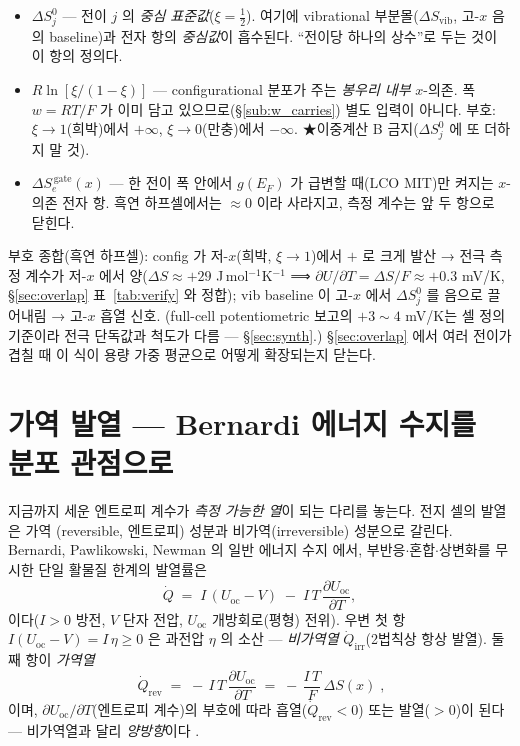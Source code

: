 \documentclass[11pt,a4paper]{article}
\newcommand{\rev}{\mathrm{rev}}
\newcommand{\irr}{\mathrm{irr}}
\newcommand{\oc}{\mathrm{oc}}
\newcommand{\vibr}{\mathrm{vib}}
\begin{document}
\begin{itemize}[leftmargin=1.4em,itemsep=3pt]
\item $\Delta S^0_j$ — 전이 $j$ 의 \emph{중심 표준값}($\xi=\tfrac12$). 여기에 vibrational
부분몰($\Delta S_\vibr$, 고-$x$ 음의 baseline)과 전자 항의 \emph{중심값}이 흡수된다. ``전이당 하나의
상수''로 두는 것이 이 항의 정의다.
\item $R\ln[\xi/(1-\xi)]$ — configurational 분포가 주는 \emph{봉우리 내부} $x$-의존. 폭 $w=RT/F$ 가
이미 담고 있으므로(\S\ref{sub:w_carries}) 별도 입력이 아니다. 부호: $\xi\to1$(희박)에서 $+\infty$,
$\xi\to0$(만충)에서 $-\infty$. ★이중계산 B 금지($\Delta S^0_j$ 에 또 더하지 말 것).
\item $\Delta S_e^{\,\mathrm{gate}}(x)$ — 한 전이 폭 안에서 $g(E_F)$ 가 급변할 때(LCO MIT)만 켜지는
$x$-의존 전자 항. 흑연 하프셀에서는 $\approx0$ 이라 사라지고, 측정 계수는 앞 두 항으로 닫힌다.
\end{itemize}

부호 종합(흑연 하프셀): config 가 저-$x$(희박, $\xi\to1$)에서 $+$ 로 크게 발산 → 전극 측정 계수가
저-$x$ 에서 양($\Delta S\approx+29$ J\,mol$^{-1}$K$^{-1}$ ⟹ $\partial U/\partial T=\Delta S/F\approx
+0.3$ mV/K, \S\ref{sec:overlap} 표~\ref{tab:verify} 와 정합); vib baseline 이 고-$x$ 에서 $\Delta S^0_j$
를 음으로 끌어내림 → 고-$x$ 흡열 신호. (full-cell potentiometric 보고의 $+3\!\sim\!4$ mV/K는 셀 정의
기준이라 전극 단독값과 척도가 다름 — \S\ref{sec:synth}.) \S\ref{sec:overlap} 에서 여러 전이가 겹칠 때
이 식이 용량 가중 평균으로 어떻게 확장되는지 닫는다.

\section{가역 발열 — Bernardi 에너지 수지를 분포 관점으로}\label{sec:bernardi}
지금까지 세운 엔트로피 계수가 \emph{측정 가능한 열}이 되는 다리를 놓는다. 전지 셀의 발열은 가역
(reversible, 엔트로피) 성분과 비가역(irreversible) 성분으로 갈린다. Bernardi, Pawlikowski, Newman 의
일반 에너지 수지 \cite{bernardi1985} 에서, 부반응$\cdot$혼합$\cdot$상변화를 무시한 단일 활물질 한계의
발열률은
\begin{equation}
\dot Q \;=\; I\,(U_\oc-V) \;-\; I\,T\,\frac{\partial U_\oc}{\partial T},
\label{eq:bernardi}
\end{equation}
이다($I>0$ 방전, $V$ 단자 전압, $U_\oc$ 개방회로(평형) 전위). 우변 첫 항 $I(U_\oc-V)=I\,\eta\ge0$ 은
과전압 $\eta$ 의 소산 — \emph{비가역열} $\dot Q_\irr$(2법칙상 항상 발열). 둘째 항이 \emph{가역열}
\begin{equation}
\boxed{\;\dot Q_\rev \;=\; -\,I\,T\,\frac{\partial U_\oc}{\partial T}
       \;=\; -\,\frac{I\,T}{F}\,\Delta S(x)\;,}
\label{eq:qrev}
\end{equation}
이며, $\partial U_\oc/\partial T$(엔트로피 계수)의 부호에 따라 흡열($\dot Q_\rev<0$) 또는 발열($>0$)이
된다 — 비가역열과 달리 \emph{양방향}이다 \cite{bernardi1985,standardised2024}.
\end{document}
